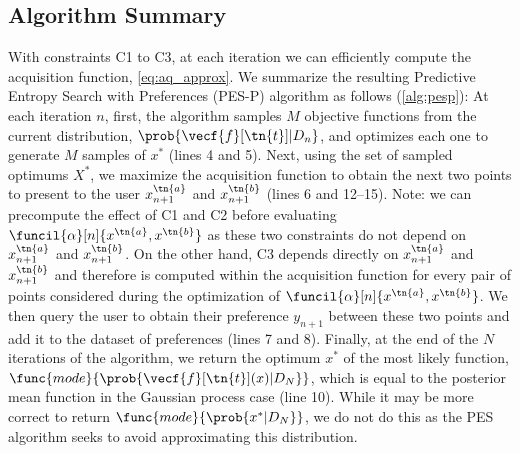 \subsection{Algorithm Summary}
With constraints C1 to C3, at each iteration we can efficiently compute the
acquisition function, \cref{eq:aq_approx}. We summarize the resulting Predictive
Entropy Search with Preferences (PES-P) algorithm as follows (\cref{alg:pesp}):
At each iteration $n$, first, the algorithm samples $M$ objective functions from
the current distribution, $\prob{\vecf{f}[\tn{t}]|D_n}$, and optimizes each one
to generate $M$ samples of $x^*$ (lines 4 and 5).  Next, using the set of
sampled optimums $X^*$, we maximize the acquisition function to obtain the next
two points to present to the user $x_{n+1}^\tn{a}$ and $x_{n+1}^\tn{b}$ (lines 6
and 12--15). Note: we can precompute the effect of C1 and C2 before evaluating
$\funcil{\alpha}[n]{x^\tn{a}, x^\tn{b}}$ as these two constraints do not depend
on $x_{n+1}^\tn{a}$ and $x_{n+1}^\tn{b}$. On the other hand, C3 depends directly
on $x_{n+1}^\tn{a}$ and $x_{n+1}^\tn{b}$ and therefore is computed within the
acquisition function for every pair of points considered during the optimization
of $\funcil{\alpha}[n]{x^\tn{a}, x^\tn{b}}$. We then query the user to obtain
their preference $y_{n+1}$ between these two points and add it to the dataset of
preferences (lines 7 and 8). Finally, at the end of the $N$ iterations of the
algorithm, we return the optimum $x^*$ of the most likely function,
$\func{mode}{\prob{\vecf{f}[\tn{t}](x)| D_N}}$, which is equal to the posterior
mean function in the Gaussian process case (line 10). While it may be more
correct to return $\func{mode}{\prob{x^*|D_N}}$, we do not do this as the PES
algorithm seeks to avoid approximating this distribution.

